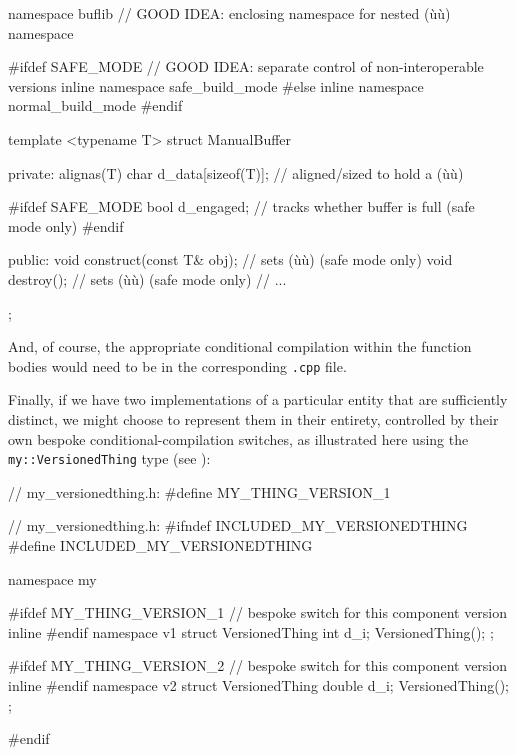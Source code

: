 \begin{emcppslisting}
namespace buflib  // GOOD IDEA: enclosing namespace for nested (ù{}ù) namespace
{
#ifdef SAFE_MODE  // GOOD IDEA: separate control of non-interoperable versions
    inline namespace safe_build_mode
#else
    inline namespace normal_build_mode
#endif
    {
        template <typename T>
        struct ManualBuffer
        {
        private:
            alignas(T) char d_data[sizeof(T)];  // aligned/sized to hold a (ù{}ù)

#ifdef SAFE_MODE
            bool d_engaged;  // tracks whether buffer is full (safe mode only)
#endif

        public:
            void construct(const T& obj);  // sets (ù{}ù) (safe mode only)
            void destroy();                // sets (ù{}ù) (safe mode only)
            // ...
        };
    }
}
\end{emcppslisting}
    
\noindent And, of course, the appropriate conditional compilation within the
function bodies would need to be in the corresponding \lstinline!.cpp!
file.

Finally, if we have two implementations of a particular entity that are
sufficiently distinct, we might choose to represent them in their
entirety, controlled by their own bespoke conditional-compilation
switches, as illustrated here using the \lstinline!my::VersionedThing! type
(see ): 

\begin{emcppshiddenlisting}[emcppsbatch=e7]
// my_versionedthing.h:
#define MY_THING_VERSION_1
\end{emcppshiddenlisting}
\begin{emcppslisting}[emcppsbatch=e7]
// my_versionedthing.h:
#ifndef INCLUDED_MY_VERSIONEDTHING
#define INCLUDED_MY_VERSIONEDTHING

namespace my
{
#ifdef MY_THING_VERSION_1  // bespoke switch for this component version
    inline
#endif
    namespace v1
    {
        struct VersionedThing
        {
            int d_i;
            VersionedThing();
        };
    }

#ifdef MY_THING_VERSION_2  // bespoke switch for this component version
    inline
#endif
    namespace v2
    {
        struct VersionedThing
        {
            double d_i;
            VersionedThing();
        };
    }
}
#endif
\end{emcppslisting}
    
